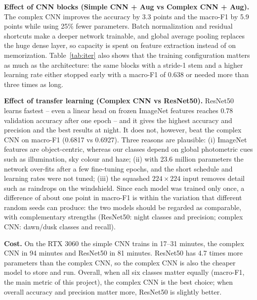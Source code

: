 \documentclass[12pt,letterpaper]{article}
\begin{document}
\textbf{Effect of CNN blocks (Simple CNN + Aug vs Complex CNN + Aug).} The complex CNN improves the accuracy by 3.3
points and the macro-F1 by 5.9 points while using 25\% fewer parameters. Batch normalization and residual shortcuts make
a deeper network trainable, and global average pooling replaces the huge dense layer, so capacity is spent on feature
extraction instead of on memorization. Table~\ref{tab:iter} also shows that the training configuration matters as much
as the architecture: the same blocks with a stride-1 stem and a higher learning rate either stopped early with a
macro-F1 of 0.638 or needed more than three times as long.

\textbf{Effect of transfer learning (Complex CNN vs ResNet50).} ResNet50 learns fastest -- even a linear head on frozen
ImageNet features reaches 0.78 validation accuracy after one epoch -- and it gives the highest accuracy and precision
and the best results at night. It does not, however, beat the complex CNN on macro-F1 (0.6817 vs 0.6927). Three reasons
are plausible: (i) ImageNet features are object-centric, whereas our classes depend on global photometric cues such as
illumination, sky colour and haze; (ii) with 23.6 million parameters the network over-fits after a few fine-tuning
epochs, and the short schedule and learning rates were not tuned; (iii) the squashed $224\times224$ input removes detail
such as raindrops on the windshield. Since each model was trained only once, a difference of about one point in
macro-F1 is within the variation that different random seeds can produce: the two models should be regarded as
comparable, with complementary strengths (ResNet50: night classes and precision; complex CNN: dawn/dusk classes and
recall).

\textbf{Cost.} On the RTX 3060 the simple CNN trains in 17--31 minutes, the complex CNN in 94 minutes and ResNet50 in 81
minutes. ResNet50 has 4.7 times more parameters than the complex CNN, so the complex CNN is also the cheaper model to
store and run. Overall, when all six classes matter equally (macro-F1, the main metric of this project), the complex
CNN is the best choice; when overall accuracy and precision matter more, ResNet50 is slightly better.

\end{document}
